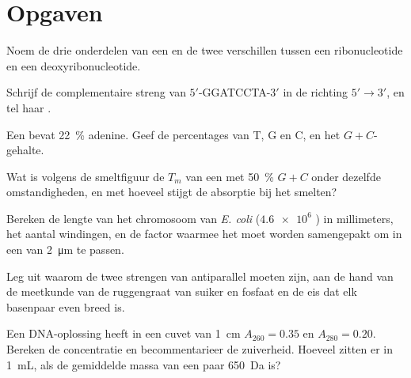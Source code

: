 \section{Opgaven}

\begin{exercise}[$\star$]\label{exo:b1:nucleic-acids:1}
Noem de drie onderdelen van een  en de twee verschillen tussen een
ribonucleotide en een deoxyribonucleotide.
\end{exercise}

\begin{exercise}[$\star$]\label{exo:b1:nucleic-acids:2}
Schrijf de complementaire streng van $5'$-GGATCCTA-$3'$ in de richting
$5' \to 3'$, en tel haar .
\end{exercise}

\begin{exercise}[$\star$]\label{exo:b1:nucleic-acids:3}
Een  bevat \qty{22}{\%} adenine. Geef de percentages van T, G en C, en het
$G + C$-gehalte.
\end{exercise}

\begin{exercise}[$\star$]\label{exo:b1:nucleic-acids:4}
Wat is volgens de smeltfiguur de $T_m$ van een  met \qty{50}{\%} $G + C$ onder
dezelfde omstandigheden, en met hoeveel stijgt de absorptie bij het smelten?
\end{exercise}

\begin{exercise}[$\star\star$]\label{exo:b1:nucleic-acids:5}
Bereken de lengte van het chromosoom van \emph{E. coli} ($\num{4.6e6}$
) in millimeters, het aantal windingen, en de factor waarmee het moet
worden samengepakt om in een  van \qty{2}{\micro m} te passen.
\end{exercise}

\begin{exercise}[$\star\star$]\label{exo:b1:nucleic-acids:6}
Leg uit waarom de twee strengen van  antiparallel moeten zijn, aan de hand van
de meetkunde van de ruggengraat van suiker en fosfaat en de eis dat elk basenpaar
even breed is.
\end{exercise}

\begin{exercise}[$\star\star$]\label{exo:b1:nucleic-acids:7}
Een DNA-oplossing heeft in een cuvet van \qty{1}{cm} $A_{260} = 0.35$ en
$A_{280} = 0.20$. Bereken de concentratie en becommentarieer de zuiverheid.
Hoeveel  zitten er in \qty{1}{mL}, als de gemiddelde massa van een paar
\qty{650}{Da} is?
\end{exercise}

